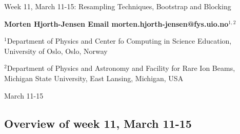 \documentclass[%
oneside,                 %
final,                   %
10pt]{article}
\begin{document}

\newcommand{\exercisesection}[1]{\subsection*{#1}}






\thispagestyle{empty}

\begin{center}
{\LARGE\bf
\begin{spacing}{1.25}
Week 11, March 11-15: Resampling Techniques, Bootstrap and Blocking
\end{spacing}
}
\end{center}


\begin{center}
{\bf Morten Hjorth-Jensen  Email morten.hjorth-jensen@fys.uio.no${}^{1, 2}$} \\ [0mm]
\end{center}

\begin{center}
\centerline{{\small ${}^1$Department of Physics and Center fo Computing in Science Education, University of Oslo, Oslo, Norway}}
\centerline{{\small ${}^2$Department of Physics and Astronomy and Facility for Rare Ion Beams, Michigan State University, East Lansing, Michigan, USA}}
\end{center}
    

\begin{center}
March 11-15
\end{center}

\vspace{1cm}


\subsection{Overview of week 11, March 11-15}

\end{document}
